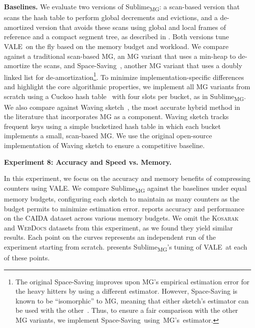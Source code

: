 \documentclass[sigconf]{acmart}
\newcommand{\sketch}{Sublime}
\newcommand{\sketchmg}{\sketch\textsubscript{MG}\xspace}
\newcommand{\counterencodingabbrv}{VALE}
\begin{document}
\textbf{Baselines.}
We evaluate two versions of \sketchmg: a scan-based version that scans the hash table to perform global decrements and evictions, and a de-amortized version that avoids these scans using global and local frames of reference and a compact segment tree, as described in .
Both versions tune \counterencodingabbrv\ on the fly based on the memory budget and workload.
We compare against a traditional scan-based MG, an MG variant that uses a min-heap to de-amortize the scans, and Space-Saving~\cite{SpaceSaving}, another MG variant that uses a doubly linked list for de-amortization\footnote{
    The original Space-Saving improves upon MG's empirical estimation error for the heavy hitters by using a different estimator.
    However, Space-Saving is known to be ``isomorphic'' to MG, meaning that either sketch's estimator can be used with the other~\cite{MergeableSummaries}.
    Thus, to ensure a fair comparison with the other MG variants, we implement \mbox{Space-Saving using MG's estimator}.
}.
To minimize implementation-specific differences and highlight the core algorithmic properties, we implement all MG variants from scratch using a Cuckoo hash table~\cite{CuckooHashing,CuckooHashingConference} with four slots per bucket, as in \sketchmg.
We also compare against Waving sketch~\cite{WavingSketch}, the most accurate hybrid method in the literature that incorporates MG as a component.
Waving sketch tracks frequent keys using a simple bucketized hash table in which each bucket implements a small, scan-based MG.
We use the original open-source implementation of Waving sketch to ensure a competitive baseline.

\hypertarget{experiment:accuracy_mg}{\textbf{Experiment 8: Accuracy and Speed vs. Memory.}}
In this experiment, we focus on the accuracy and memory benefits of compressing counters using \counterencodingabbrv.
We compare \sketchmg against the baselines under equal memory budgets, configuring each sketch to maintain as many counters as the budget permits to minimize estimation error.
 reports accuracy and performance on the \textsc{CAIDA} dataset across various memory budgets.
We omit the \textsc{Kosarak} and \textsc{WebDocs} datasets from this experiment, as we found they yield similar results.
Each point on the curves represents an independent run of the experiment starting from scratch.
 presents \sketchmg's tuning of \counterencodingabbrv\ at each of these points.
\end{document}
